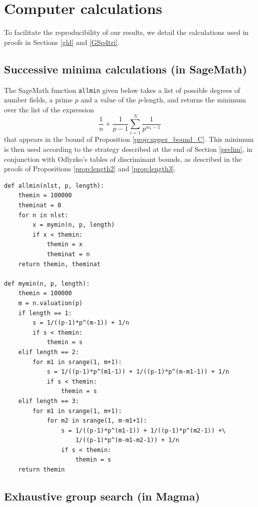 \documentclass{amsart}
\theoremstyle{definition}
\begin{document}
\appendix

\section{Computer calculations}\label{app-calc}

To facilitate the reproducibility of our results, we detail the calculations used in proofs in Sections \ref{gld} and \ref{GSp4tri}.

\subsection{Successive minima calculations (in SageMath)}\label{app-sage}

The SageMath function \texttt{allmin} given below takes a list of possible degrees of number fields, a prime $p$ and a value of the $p$-length, and returns the minimum over the list of the expression
\begin{equation*}
  \frac{1}{n}+\frac{1}{p-1}\sum_{i=1}^N \frac{1}{p^{m_i-1}}
\end{equation*}
that appears in the bound of Proposition \ref{prop:upper_bound_C}.
This minimum is then used according to the strategy described at the end of Section \ref{prelim}, in conjunction with Odlyzko's tables of discriminant bounds, as described in the proofs of Propositions \ref{prop:length2} and \ref{prop:length3}.

\begin{verbatim}
def allmin(nlst, p, length):
    themin = 100000
    theminat = 0
    for n in nlst:
        x = mymin(n, p, length)
        if x < themin:
            themin = x
            theminat = n
    return themin, theminat

def mymin(n, p, length):
    themin = 100000
    m = n.valuation(p)
    if length == 1:
        s = 1/((p-1)*p^(m-1)) + 1/n
        if s < themin:
            themin = s
    elif length == 2:
        for m1 in srange(1, m+1):
            s = 1/((p-1)*p^(m1-1)) + 1/((p-1)*p^(m-m1-1)) + 1/n
            if s < themin:
                themin = s
    elif length == 3:
        for m1 in srange(1, m+1):
            for m2 in srange(1, m-m1+1):
                s = 1/((p-1)*p^(m1-1)) + 1/((p-1)*p^(m2-1)) +\
                    1/((p-1)*p^(m-m1-m2-1)) + 1/n
                if s < themin:
                    themin = s
    return themin
\end{verbatim}

\subsection{Exhaustive group search (in Magma)}\label{app-magma}
\end{document}

